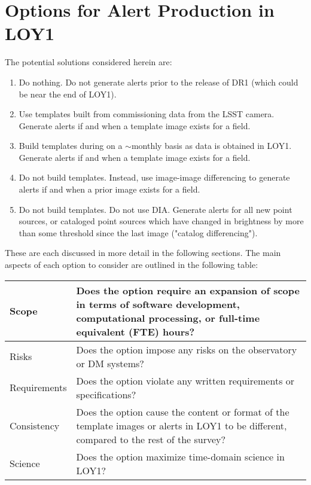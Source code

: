 \documentclass[DM,lsstdraft,toc]{lsstdoc}
\begin{document}
\clearpage
\section{Options for Alert Production in LOY1}\label{sec:potsol}

The potential solutions considered herein are:
\begin{enumerate}
\item Do nothing. Do not generate alerts prior to the release of DR1 (which could be near the end of LOY1).
\item Use templates built from commissioning data from the LSST camera. Generate alerts if and when a template image exists for a field. 
\item Build templates during on a $\sim$monthly basis as data is obtained in LOY1. Generate alerts if and when a template image exists for a field.
\item Do not build templates. Instead, use image-image differencing to generate alerts if and when a prior image exists for a field.
\item Do not build templates. Do not use DIA. Generate alerts for all new point sources, or cataloged point sources which have changed in brightness by more than some threshold since the last image ("catalog differencing").
\end{enumerate}

These are each discussed in more detail in the following sections. The main aspects of each option to consider are outlined in the following table:
\begin{center}
\begin{tabular}{|p{2.5cm}|p{13cm}|}
\hline
Scope & Does the option require an expansion of scope in terms of software development, computational processing, or full-time equivalent (FTE) hours? \\
\hline
Risks & Does the option impose any risks on the observatory or DM systems?  \\
\hline
Requirements & Does the option violate any written requirements or specifications? \\
\hline
Consistency & Does the option cause the content or format of the template images or alerts in LOY1 to be different, compared to the rest of the survey? \\ 
\hline
Science & Does the option maximize time-domain science in LOY1? \\
\hline
\end{tabular}
\end{center} 
\end{document}
